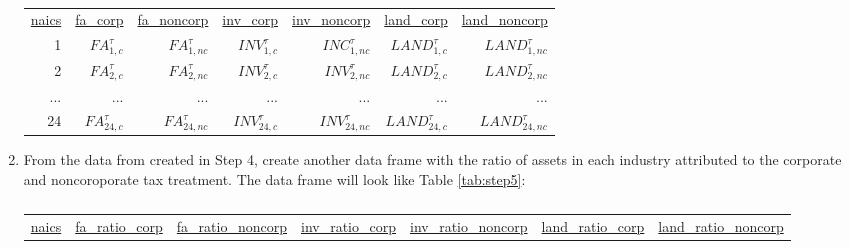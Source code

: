 \documentclass[a4paper]{article}
\begin{document}
\begin{enumerate}
\begin{table}[h!]
  \centering
  \caption{}
    \begin{tabular}{rrrrrrr}
    
    \underline{naics} & \underline{fa\_corp} & \underline{fa\_noncorp} & \underline{inv\_corp} & \underline{inv\_noncorp} & \underline{land\_corp} & \underline{land\_noncorp} \\
    
    1     & $FA^{\tau}_{1,c}$ & $FA^{\tau}_{1,nc}$ & $INV^{\tau}_{1,c}$ & $INC^{\tau}_{1,nc}$ & $LAND^{\tau}_{1,c}$ & $LAND^{\tau}_{1,nc}$ \\
    2     & $FA^{\tau}_{2,c}$ & $FA^{\tau}_{2,nc}$ & $INV^{\tau}_{2,c}$ & $INV^{\tau}_{2,nc}$ & $LAND^{\tau}_{2,c}$ & $LAND^{\tau}_{2,nc}$ \\
    ...    & ...     & ...    & ...     & ...     & ...     & ... \\
    24    & $FA^{\tau}_{24,c}$ & $FA^{\tau}_{24,nc}$ & $INV^{\tau}_{24,c}$ & $INV^{\tau}_{24,nc}$ & $LAND^{\tau}_{24,c}$ & $LAND^{\tau}_{24,nc}$ \\
    
    \end{tabular}%
  \label{tab:step4}%
\end{table}%


\item From the data from created in Step 4, create another data frame with the ratio of assets in each industry attributed to the corporate and noncoroporate tax treatment.  The data frame will look like Table \ref{tab:step5}:

\begin{table}[h!]
  \centering
  \caption{}
    \begin{tabular}{rrrrrrr}
    
    \underline{naics} & \underline{fa\_ratio\_corp} & \underline{fa\_ratio\_noncorp} & \underline{inv\_ratio\_corp} & \underline{inv\_ratio\_noncorp} & \underline{land\_ratio\_corp} & \underline{land\_ratio\_noncorp} \\
    

\end{tabular}
\end{table}
\end{enumerate}
\end{document}
